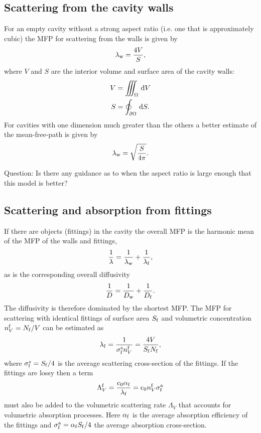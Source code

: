 \documentclass[a4paper]{article}
\numberwithin{equation}{section}
\providecommand\oiint{\oint}
\begin{document}
\subsection[Scattering from the cavity walls]{Scattering from the cavity walls}
\label{sc:sum:walls}

For an empty cavity without a strong aspect ratio (i.e. one that is approximately cubic) 
the MFP for scattering from the walls is given by~\citep{Navarro2015}
\begin{align}
\lambda_{\mathrm{w}} = \frac{4V}{S},
\end{align}
where $V$ and $S$ are the interior volume and surface area of the cavity
walls:
\begin{align}
V &= \iiint_{\Omega }\dif{V} \\
S &= \oiint_{\partial\Omega }\dif{S} .
\end{align}
For cavities with one dimension much greater than the others a better estimate
of the mean-free-path is given by~\citep{Visentin2012}
\begin{align}
\lambda_{\mathrm{w}} = \sqrt{\frac{S}{4\pi}} .
\end{align}

{\color{red}Question: Is there any guidance as to when the aspect ratio is large enough that
this model is better?}

\subsection[Scattering and absorption from fittings]{Scattering and absorption from fittings}
\label{sc:sum:fit}

If there are objects (fittings) in the cavity the overall MFP is the harmonic
mean of the MFP of the walls and fittings,
\begin{align}
\frac{1}{\lambda} = \frac{1}{\lambda_{\mathrm{w}}} + \frac{1}{\lambda_{\mathrm{f}}},
\end{align}
as is the corresponding overall diffusivity~\citep{Valeau2007}
\begin{align}
\frac{1}{D} = \frac{1}{D_{\mathrm{w}}} + \frac{1}{D_{\mathrm{f}}}.
\end{align}
The diffusivity is therefore dominated by the shortest MFP. The MFP for
scattering with identical fittings of surface area $S_{\mathrm{f}}$ and volumetric
concentration $n_V^{\mathrm{f}}=N_{\mathrm{f}}/V$ can be estimated as~\citep{Valeau2007}
\begin{align}
\lambda_{\mathrm{f}} = \frac{1}{\sigma_{\mathrm{f}}^{\mathrm{s}} n_V^{\mathrm{f}}} = \frac{4V}{S_{\mathrm{f}} N_{\mathrm{f}}},
\end{align}
where $\sigma_{\mathrm{f}}^s=S_{\mathrm{f}}/4$ is the average scattering cross-section of the
fittings. If the fittings are lossy then a term
\begin{align}
\Lambda_V^{\mathrm{f}} = \frac{\mathrm{c}_0\alpha_{\mathrm{f}}}{\lambda_{\mathrm{f}}} = \mathrm{c}_0 n_V^{\mathrm{f}} \sigma_{\mathrm{f}}^{\mathrm{a}}
\end{align}
must also be added to the volumetric scattering rate $\Lambda_V$ that accounts
for volumetric absorption processes. Here $\alpha_{\mathrm{f}}$ is the average
absorption efficiency of the fittings and $\sigma_{\mathrm{f}}^{\mathrm{a}}=\alpha_{\mathrm{f}} S_{\mathrm{f}}/4$ the
average absorption cross-section.
\end{document}
